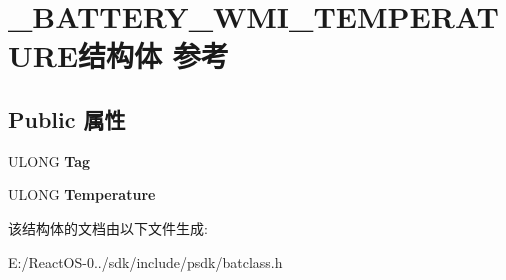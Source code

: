 \hypertarget{struct___b_a_t_t_e_r_y___w_m_i___t_e_m_p_e_r_a_t_u_r_e}{}\section{\+\_\+\+B\+A\+T\+T\+E\+R\+Y\+\_\+\+W\+M\+I\+\_\+\+T\+E\+M\+P\+E\+R\+A\+T\+U\+R\+E结构体 参考}
\label{struct___b_a_t_t_e_r_y___w_m_i___t_e_m_p_e_r_a_t_u_r_e}
\subsection*{Public 属性}
\begin{DoxyCompactItemize}
\item 
\mbox{\label{struct___b_a_t_t_e_r_y___w_m_i___t_e_m_p_e_r_a_t_u_r_e_a671e6740bfc204ddfd545bbfbff3c8c8}} 
U\+L\+O\+NG {\bfseries Tag}
\item 
\mbox{\label{struct___b_a_t_t_e_r_y___w_m_i___t_e_m_p_e_r_a_t_u_r_e_ab44670d9d29c9ea9c21c3014ff4ae84a}} 
U\+L\+O\+NG {\bfseries Temperature}
\end{DoxyCompactItemize}


该结构体的文档由以下文件生成\+:\begin{DoxyCompactItemize}
\item 
E\+:/\+React\+O\+S-\/0../sdk/include/psdk/batclass.\+h\end{DoxyCompactItemize}
